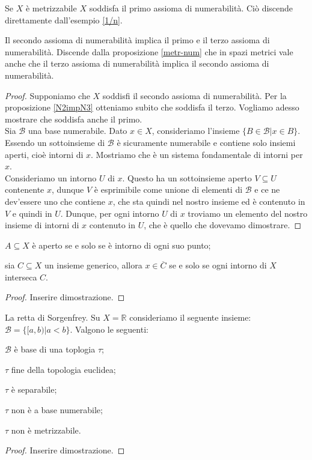 \documentclass{article}
\begin{document}
\begin{ftt}
	Se $X$ è metrizzabile $X$ soddisfa il primo assioma di numerabilità. Ciò discende direttamente dall'esempio \ref{1/n}.
\end{ftt}

\begin{prop}
	Il secondo assioma di numerabilità implica il primo e il terzo assioma di numerabilità. Discende dalla proposizione \ref{metr-num} che in spazi metrici vale anche che il terzo assioma di numerabilità implica il secondo assioma di numerabilità.
\end{prop}

\begin{proof}
	Supponiamo che $X$ soddisfi il secondo assioma di numerabilità. Per la proposizione \ref{N2impN3} otteniamo subito che soddisfa il terzo. Vogliamo adesso mostrare che soddisfa anche il primo. \\
	Sia $\mathcal{B}$ una base numerabile. Dato $x \in X$, consideriamo l'insieme $\{ B \in \mathcal{B} | x \in B \}$. Essendo un sottoinsieme di $\mathcal{B}$ è sicuramente numerabile e contiene solo insiemi aperti, cioè intorni di $x$. Mostriamo che è un sistema fondamentale di intorni per $x$. \\
	Consideriamo un intorno $U$ di $x$. Questo ha un sottoinsieme aperto $V \subseteq U$ contenente $x$, dunque $V$ è esprimibile come unione di elementi di $\mathcal{B}$ e ce ne dev'essere uno che contiene $x$, che sta quindi nel nostro insieme ed è contenuto in $V$ e quindi in $U$. Dunque, per ogni intorno $U$ di $x$ troviamo un elemento del nostro insieme di intorni di $x$ contenuto in $U$, che è quello che dovevamo dimostrare.
\end{proof}

\begin{prop}
	\begin{nlist}
		\item $A \subseteq X$ è aperto se e solo se è intorno di ogni suo punto;
		\item sia $C \subseteq X$ un insieme generico, allora $x \in \overline{C}$ se e solo se ogni intorno di $X$ interseca $C$.
	\end{nlist}
\end{prop}

\begin{proof}
	Inserire dimostrazione.
\end{proof}

\begin{ex}
	La retta di Sorgenfrey. Su $X=\mathbb{R}$ consideriamo il seguente insieme: $\mathcal{B}=\{[a, b) | a<b\}$. Valgono le seguenti:
	\begin{nlist}
		\item $\mathcal{B}$ è base di una toplogia $\tau$;
		\item $\tau$ fine della topologia euclidea;
		\item $\tau$ è separabile;
		\item $\tau$ non è a base numerabile;
		\item $\tau$ non è metrizzabile.
	\end{nlist}
\end{ex}

\begin{proof}
	Inserire dimostrazione.
\end{proof}
\end{document}

